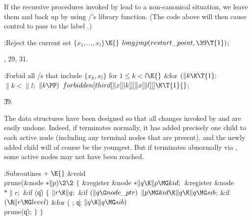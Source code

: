 If the recursive procedures invoked by  lead to a
non-canonical
situation, we leave them and back up by using \CEE/'s 
library function. (The code above will then cause control to pass
to the label .)

\Y\B\4:Reject the current set $\{x_1,\ldots,x_l\}$\X${}\E{}$\6
$\\{longjmp}(\\{restart\_point},\39\T{1}){}$;\par
{}, 29, 31.\fi

\B{}:Forbid all \SET/s that include $\{x_k,x_l\}$ for $1\le k<l$\X${}%
\E{}$\6
\&{for} ${}(\|k\K\T{1};{}$ ${}\|k<\|l;{}$ ${}\|k\PP){}$\1\5
${}\\{forbidden}[\\{third}[\|x[\|k]][\|x[\|l]]]\K\T{1}{}$;\2\par
\U39.\fi

The data structures have been designed so that all changes invoked by
 and  are easily undone. Indeed, if 
terminates normally, it has added precisely one child to each active node
(including any terminal nodes that are present), and the newly added child
will of course be the youngest. But if  terminates abnormally
via , some active nodes may not have been reached.

\Y\B\4:Subroutines\X${}\mathrel+\E{}$\6
\1\1\&{void} \\{prune}(\&{node} ${}{*}\|p)\2\2{}$\6
${}\{{}$\1\6
\&{register} \&{node} ${}{*}\|q\K\|p\MG\\{kid};{}$\6
\&{register} \&{node} ${}{*}\|r;{}$\7
\&{if} (\|q)\5
${}\{{}$\1\6
${}\|r\K\|q;{}$\6
\&{if} ${}(\|q\G\\{node\_ptr}){}$\1\5
${}\|p\MG\\{kid}\K\|q\K\|q\MG\\{sib}{}$;\2\6
\&{if} ${}(\R\|r\MG\\{level}){}$\1\6
\&{for} ( ; \|q; ${}\|q\K\|q\MG\\{sib}){}$\1\5
\\{prune}(\|q);\2\2\6
\4${}\}{}$\2\6
\4${}\}{}$\2\par
\fi

